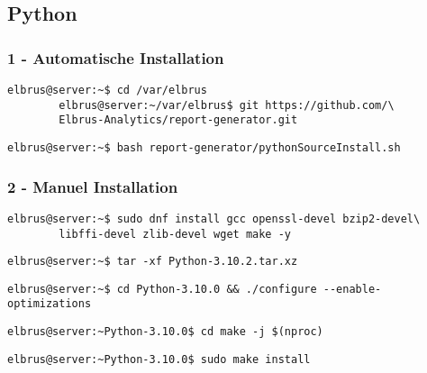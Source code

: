 \documentclass{article}
\begin{document}
	\newpage
	\subsection{Python}
	\subsubsection{1 - Automatische Installation}
	\begin{lstlisting}[caption={Kopieren des Github Repositorys 'report-generator'.}]
		elbrus@server:~$ cd /var/elbrus
		elbrus@server:~/var/elbrus$ git https://github.com/\
		Elbrus-Analytics/report-generator.git
	\end{lstlisting}

	\begin{lstlisting}[caption={Ausführen des 'pythonSourceInstall.sh' Scripts.}]
		elbrus@server:~$ bash report-generator/pythonSourceInstall.sh
	\end{lstlisting}
	
	\subsubsection{2 - Manuel Installation}
	\begin{lstlisting}[caption={Installieren von benötigten Packeten und Abhängigkeiten.}]
		elbrus@server:~$ sudo dnf install gcc openssl-devel bzip2-devel\
		libffi-devel zlib-devel wget make -y
	\end{lstlisting}
	
	\begin{lstlisting}[caption={Extrahieren der installierent Dateien.}]
		elbrus@server:~$ tar -xf Python-3.10.2.tar.xz
	\end{lstlisting}
	
	\begin{lstlisting}[caption={Wechseln zu source Verzeichniss. Und ausführen des Konfigurations Scripts.}]
		elbrus@server:~$ cd Python-3.10.0 && ./configure --enable-optimizations
	\end{lstlisting}

	\begin{lstlisting}[caption={Starten des build Prozesses.}]
		elbrus@server:~Python-3.10.0$ cd make -j $(nproc)
	\end{lstlisting}
	
	\begin{lstlisting}[caption={Installieren von Python.}]
		elbrus@server:~Python-3.10.0$ sudo make install
	\end{lstlisting}
	
\end{document}
